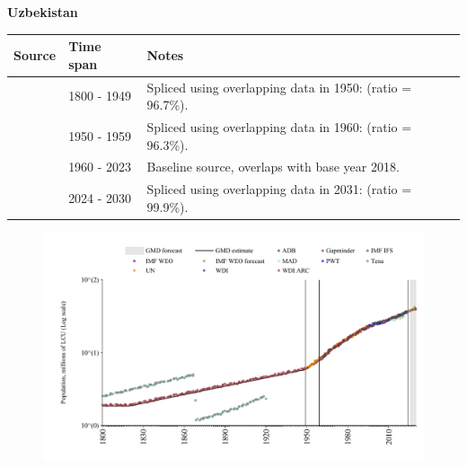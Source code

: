 \documentclass[12pt,a4paper,landscape]{article}
\begin{document}
\begin{adjustbox}{max totalsize={\paperwidth}{\paperheight},center}
\begin{minipage}[t][\textheight][t]{\textwidth}
\vspace*{0.5cm}
{}
\begin{center}
{\Large\bfseries Uzbekistan}
\end{center}
\vspace{0.5cm}
\begin{table}[H]
\centering
\small
\begin{tabular}{|l|l|l|}
\hline
\textbf{Source} & \textbf{Time span} & \textbf{Notes} \\
\hline
\rowcolor{white}\cite{Gapminder}& 1800 - 1949 &Spliced using overlapping data in 1950: (ratio = 96.7\%).\\
\rowcolor{lightgray}\cite{IMF_IFS}& 1950 - 1959 &Spliced using overlapping data in 1960: (ratio = 96.3\%).\\
\rowcolor{white}\cite{WDI}& 1960 - 2023 &Baseline source, overlaps with base year 2018.\\
\rowcolor{lightgray}\cite{Gapminder}& 2024 - 2030 &Spliced using overlapping data in 2031: (ratio = 99.9\%).\\
\hline
\end{tabular}
\end{table}
\begin{figure}[H]
\centering
\includegraphics[width=\textwidth,height=0.6\textheight,keepaspectratio]{graphs/UZB_pop.pdf}
\end{figure}
\end{minipage}
\end{adjustbox}
\end{document}
